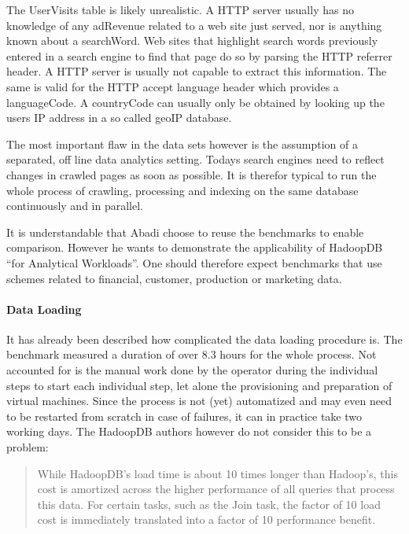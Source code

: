 \documentclass[12pt,a4paper]{scrartcl}		%
\begin{document}
The UserVisits table is likely unrealistic. A HTTP server usually has no knowledge of any adRevenue related to a web site just served, nor is anything known about a searchWord. Web sites that highlight search words previously entered in a search engine to find that page do so by parsing the HTTP referrer header. A HTTP server is usually not capable to extract this information. The same is valid for the HTTP accept language header which provides a languageCode. A countryCode can usually only be obtained by looking up the users IP address in a so called geoIP database.

The most important flaw in the data sets however is the assumption of a separated, off line data analytics setting. Todays search engines need to reflect changes in crawled pages as soon as possible. It is therefor typical to run the whole process of crawling, processing and indexing on the same database continuously and in parallel.\cite{Peng:2010:LIP:1924943.1924961}

It is understandable that Abadi choose to reuse the benchmarks to enable comparison. However he wants to demonstrate the applicability of HadoopDB ``for Analytical Workloads''. One should therefore expect benchmarks that use schemes related to financial, customer, production or marketing data.

\paragraph{Data Loading}
It has already been described how complicated the data loading procedure is. The benchmark measured a duration of over 8.3 hours for the whole process. Not accounted for is the manual work done by the operator during the individual steps to start each individual step, let alone the provisioning and preparation of virtual machines. Since the process is not (yet) automatized and may even need to be restarted from scratch in case of failures, it can in practice take two working days. The HadoopDB authors however do not consider this to be a problem\cite[6.3]{journals/pvldb/AbouzeidBARS09}:

\begin{quote}
While HadoopDB’s load time is about 10 times longer than
Hadoop’s, this cost is amortized across the higher performance of
all queries that process this data. For certain tasks, such as the Join
task, the factor of 10 load cost is immediately translated into a
factor of 10 performance benefit.
\end{quote}
\end{document}
